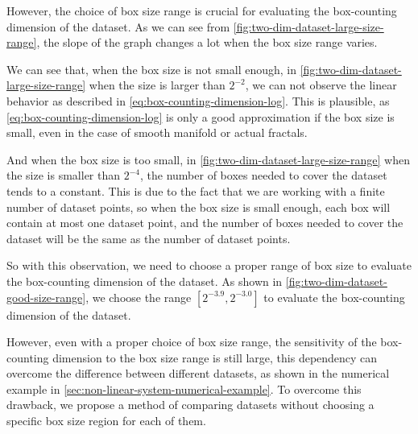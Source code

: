 However, the choice of box size range is crucial for evaluating the box-counting dimension of the dataset.
As we can see from \cref{fig:two-dim-dataset-large-size-range}, the slope of the graph changes a lot when the box size range varies.


We can see that, when the box size is not small enough, in \cref{fig:two-dim-dataset-large-size-range} when the size is larger than $2^{-2}$, we can not observe the linear behavior as described in \cref{eq:box-counting-dimension-log}.
This is plausible, as \cref{eq:box-counting-dimension-log} is only a good approximation if the box size is small, even in the case of smooth manifold or actual fractals.

And when the box size is too small, in \cref{fig:two-dim-dataset-large-size-range} when the size is smaller than $2^{-4}$, the number of boxes needed to cover the dataset tends to a constant.
This is due to the fact that we are working with a finite number of dataset points, so when the box size is small enough, each box will contain at most one dataset point, and the number of boxes needed to cover the dataset will be the same as the number of dataset points.

So with this observation, we need to choose a proper range of box size to evaluate the box-counting dimension of the dataset.
As shown in \cref{fig:two-dim-dataset-good-size-range}, we choose the range $[2^{-3.9}, 2^{-3.0}]$ to evaluate the box-counting dimension of the dataset.


However, even with a proper choice of box size range, the sensitivity of the box-counting dimension to the box size range is still large, this dependency can overcome the difference between different datasets, as shown in the numerical example in \cref{sec:non-linear-system-numerical-example}.
To overcome this drawback, we propose a method of comparing datasets without choosing a specific box size region for each of them.

